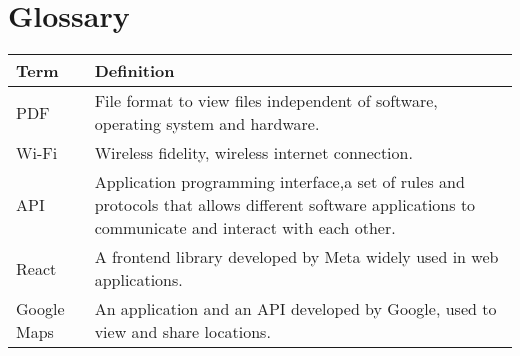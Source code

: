 \chapter{Glossary}

\begin{tabular}{|p{3cm}|p{13cm}|}
    \hline
    \textbf{Term} & \textbf{Definition} \\
    \hline
    \hline
    PDF & File format to view files independent of software, operating system and hardware.\\
    \hline
    Wi-Fi & Wireless fidelity, wireless internet connection.\\
    \hline
    API & Application programming interface,a set of rules and protocols that allows different software applications to communicate and interact with each other. \\
    \hline
    React & A frontend library developed by Meta widely used in web applications. \\
    \hline
    Google Maps & An application and an API developed by Google, used to view and share locations.\\
    \hline
    
    \end{tabular}